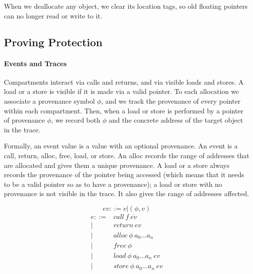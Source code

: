 \documentclass{article}
\begin{document}
When we deallocate any object, we clear its location tags, so old floating pointers
can no longer read or write to it.

\subsection{Proving Protection}




\paragraph{Events and Traces}

Compartments interact via calls and returns, and via visible loads and stores. A load or a store
is visible if it is made via a valid pointer. To each allocation we associate a provenance
symbol \(\phi\), and we track the provenance of every pointer within each compartment.
Then, when a load or store is performed by a pointer of provenance \(\phi\), we record both
\(\phi\) and the concrete address of the target object in the trace.

Formally, an event value is a value with an optional provenance. An event is a call, return,
alloc, free, load, or store. An alloc records the range of addresses that are allocated and
gives them a unique provenance. A load or a store always records the provenance of the pointer
being accessed (which means that it needs to be a valid pointer so as to have a provenance);
a load or store with no provenance is not visible in the trace. It also gives the range of
addresses affected.

\[ev ::= v | (\phi, v)\]
\[\begin{split}
e ::= & \mathit{call} ~ f ~ \overline{ev} \\
| & \mathit{return} ~ ev \\
| & \mathit{alloc} ~ \phi ~ a_0 \dots a_n \\
| & \mathit{free} ~ \phi \\
| & \mathit{load} ~ \phi ~ a_0 \dots a_n ~ ev \\
| & \mathit{store} ~ \phi ~ a_0 \dots a_n ~ ev \\
\end{split}\]
\end{document}
